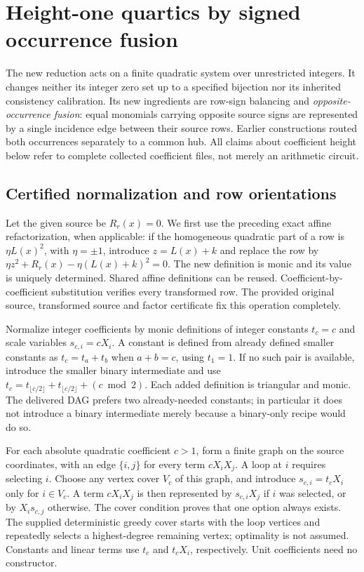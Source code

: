 \section{Height-one quartics by signed occurrence fusion}
\label{sec:signed-network}
The new reduction acts on a finite quadratic system over unrestricted
integers. It changes neither its integer zero set up to a specified
bijection nor its inherited consistency calibration. Its new ingredients
are row-sign balancing and \emph{opposite-occurrence fusion}: equal
monomials carrying opposite source signs are represented by a single
incidence edge between their source rows. Earlier constructions routed
both occurrences separately to a common hub. All claims about coefficient
height below refer to complete collected coefficient files, not merely an
arithmetic circuit.

\subsection{Certified normalization and row orientations}
Let the given source be $R_r(x)=0$. We first use the preceding exact affine
refactorization, when applicable: if the homogeneous quadratic part of a
row is $\eta L(x)^2$, with $\eta=\pm1$, introduce $z=L(x)+k$ and replace
the row by $\eta z^2+R_r(x)-\eta(L(x)+k)^2=0$. The new definition is monic
and its value is uniquely determined. Shared affine definitions can be
reused. Coefficient-by-coefficient substitution verifies every transformed
row. The provided original source, transformed source and factor
certificate fix this operation completely.

Normalize integer coefficients by monic definitions of integer constants
$t_c=c$ and scale variables $s_{c,i}=cX_i$. A constant is defined from
already defined smaller constants as $t_c=t_a+t_b$ when $a+b=c$, using
$t_1=1$. If no such pair is available, introduce the smaller binary
intermediate and use
$t_c=t_{\lfloor c/2\rfloor}+t_{\lfloor c/2\rfloor}+(c\bmod2)$.
Each added definition is triangular and monic. The delivered DAG prefers
two already-needed constants; in particular it does not introduce a
binary intermediate merely because a binary-only recipe would do so.

For each absolute quadratic coefficient $c>1$, form a finite graph on the
source coordinates, with an edge $\{i,j\}$ for every term $cX_iX_j$.
A loop at $i$ requires selecting $i$. Choose any vertex cover $V_c$ of
this graph, and introduce $s_{c,i}=t_cX_i$ only for $i\in V_c$. A term
$cX_iX_j$ is then represented by $s_{c,i}X_j$ if $i$ was selected, or by
$X_is_{c,j}$ otherwise. The cover condition proves that one option always
exists. The supplied deterministic greedy cover starts with the loop
vertices and repeatedly selects a highest-degree remaining vertex;
optimality is not assumed. Constants and linear terms use $t_c$ and
$t_cX_i$, respectively. Unit coefficients need no constructor.

